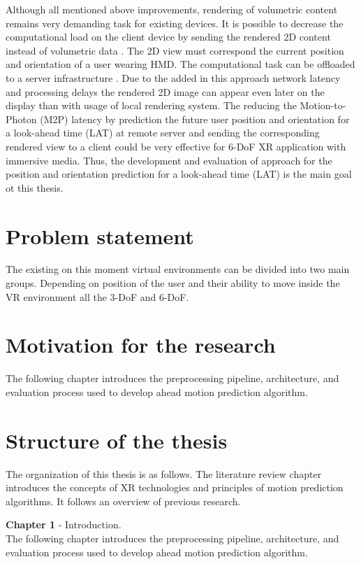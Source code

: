 Although all mentioned above improvements, rendering of volumetric content remains very demanding task for existing devices. It is possible to decrease the computational load on the client device by sending the rendered 2D content instead of volumetric data \cite{serhan_cloud_streaming}. The 2D view must correspond the current position and orientation of a user wearing HMD. The computational task can be offloaded to a server infrastructure \cite{serhan_cloud_streaming}. Due to the added in this approach network latency and processing delays the rendered 2D image can appear even later on the display than with usage of local rendering system. The reducing the Motion-to-Photon (M2P) latency by prediction the future user position and orientation for a look-ahead time (LAT) at remote server and sending the corresponding rendered view to a client could be very effective for 6-DoF XR application with immersive media. Thus, the development and evaluation of approach for the position and orientation prediction for a look-ahead time (LAT) is the main goal ot this thesis. 


\section{Problem statement}
\label{sec:intro:problem}
The existing on this moment virtual environments can be divided into two main groups. Depending on position of the user and their ability to move inside the VR environment all the 3-DoF and 6-DoF. 

\section{Motivation for the research}
\label{sec:intro:motivation}
The following chapter introduces the preprocessing pipeline, architecture, and evaluation process used to develop ahead motion prediction algorithm.


\section{Structure of the thesis}
\label{sec:intro:structure}
The organization of this thesis is as follows. The literature review chapter introduces the concepts of XR technologies and principles of motion prediction algorithms. It follows an overview of previous research. 

\textbf{Chapter 1} - Introduction.\\
The following chapter introduces the preprocessing pipeline, architecture, and evaluation process used to develop ahead motion prediction algorithm.




